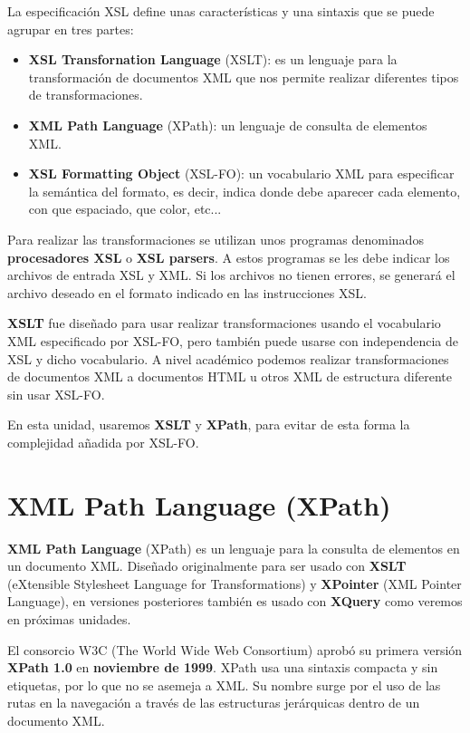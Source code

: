 La especificación XSL define unas características y una sintaxis que se puede agrupar en tres partes:

\begin{itemize}
    \item \textbf{XSL Transfornation Language} (XSLT): es un lenguaje para la transformación de documentos XML que nos permite realizar diferentes tipos de transformaciones.
    \item \textbf{XML Path Language} (XPath): un lenguaje de consulta de elementos XML.
    \item \textbf{XSL Formatting Object} (XSL-FO): un vocabulario XML para especificar la semántica del formato, es decir, indica donde debe aparecer cada elemento, con que espaciado, que color, etc...
\end{itemize}

Para realizar las transformaciones se utilizan unos programas denominados \textbf{procesadores XSL} o \textbf{XSL parsers}. A estos programas se les debe indicar los archivos de entrada XSL y XML. Si los archivos no tienen errores, se generará el archivo deseado en el formato indicado en las instrucciones XSL.

\textbf{XSLT }fue diseñado para usar realizar transformaciones usando el vocabulario XML especificado por XSL-FO, pero también puede usarse  con independencia de XSL y dicho vocabulario. A nivel académico podemos realizar transformaciones de documentos XML a documentos HTML u otros XML de estructura diferente sin usar XSL-FO.

En esta unidad, usaremos \textbf{XSLT} y \textbf{XPath}, para evitar de esta forma la complejidad añadida por XSL-FO.

\section{XML Path Language (XPath)}
\textbf{XML Path Language} (XPath) es un lenguaje para la consulta de elementos en un documento XML. Diseñado originalmente para ser usado con \textbf{XSLT} (eXtensible Stylesheet Language for Transformations) y \textbf{XPointer} (XML Pointer Language), en versiones posteriores también es usado con \textbf{XQuery} como veremos en próximas unidades.

El consorcio W3C (The World Wide Web Consortium) aprobó su primera versión \textbf{XPath 1.0} en \textbf{noviembre de 1999}. XPath usa una sintaxis compacta y sin etiquetas, por lo que no se asemeja a XML. Su nombre surge por el uso de las rutas en la navegación a través de las estructuras jerárquicas dentro de un documento XML.

